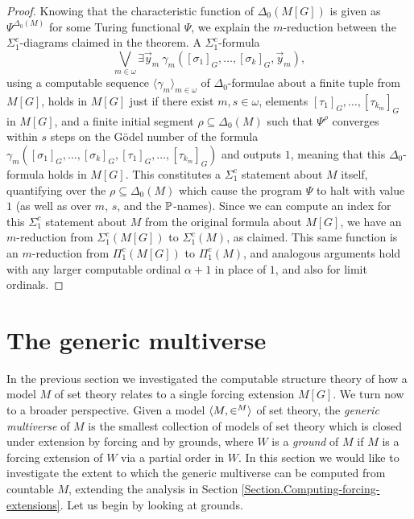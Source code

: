 \documentclass{amsart}
\newcommand{\yvec}{\vec{y}}
\begin{document}
\begin{proof}
Knowing that the characteristic function of $\Delta_0(M[G])$ is given as $\Psi^{\Delta_0(M)}$
for some Turing functional $\Psi$, we explain the $m$-reduction between the $\Sigma_1^c$-diagrams
claimed in the theorem.  A $\Sigma_1^c$-formula
$$\bigvee_{m\in\omega} \exists\yvec_m~\gamma_m([\sigma_1]_G,\ldots,[\sigma_k]_G,\yvec_m), $$
using a computable sequence $\langle\gamma_m\rangle_{m\in\omega}$ of $\Delta_0$-formulae about
a finite tuple from $M[G]$, holds in $M[G]$ just if there exist $m,s\in\omega$, elements
$[\tau_1]_G,\ldots,[\tau_{k_m}]_G$ in $M[G]$, and a finite initial segment $\rho\subseteq\Delta_0(M)$
such that $\Psi^{\rho}$ converges within $s$ steps on the G\"odel number of the formula
$\gamma_m([\sigma_1]_G,\ldots,[\sigma_k]_G,[\tau_1]_G,\ldots,[\tau_{k_m}]_G)$
and outputs $1$, meaning that this $\Delta_0$-formula holds in $M[G]$.  This constitutes
a $\Sigma_1^c$ statement about $M$ itself, quantifying over the $\rho\subseteq\Delta_0(M)$
which cause the program $\Psi$ to halt with value $1$ (as well as over $m$, $s$, and the $\P$-names).
Since we can compute an index for this $\Sigma_1^c$ statement about $M$ from the original
formula about $M[G]$, we have an $m$-reduction from $\Sigma_1^c(M[G])$ to $\Sigma_1^c(M)$,
as claimed.  This same function is an $m$-reduction from $\Pi_1^c(M[G])$ to $\Pi_1^c(M)$,
and analogous arguments hold with any larger computable ordinal $\alpha+1$ in place of $1$,
and also for limit ordinals.
\end{proof}



\section{The generic multiverse}\label{Section.Generic-multiverse}

In the previous section we investigated the computable structure theory of how a model $M$ of set theory relates to a single forcing extension $M[G]$. We turn now to a broader perspective. Given a model $\<M,\in^M>$ of set theory, the \emph{generic multiverse} of $M$ is the smallest collection of models of set theory which is closed under extension by forcing and by grounds, where $W$ is a \emph{ground} of $M$ if $M$ is a forcing extension of $W$ via a partial order in $W$. In this section we would like to investigate the extent to which the generic multiverse can be computed from countable $M$, extending the analysis in Section \ref{Section.Computing-forcing-extensions}. Let us begin by looking at grounds.
\end{document}
